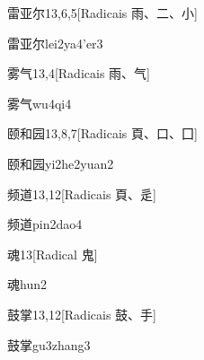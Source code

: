 \begin{entry}{雷亚尔}{13,6,5}[Radicais ⾬、⼆、⼩]
  \begin{phonetics}{雷亚尔}{lei2ya4'er3}
  \end{phonetics}
\end{entry}

\begin{entry}{雾气}{13,4}[Radicais ⾬、⽓]
  \begin{phonetics}{雾气}{wu4qi4}
  \end{phonetics}
\end{entry}

\begin{entry}{颐和园}{13,8,7}[Radicais ⾴、⼝、⼞]
  \begin{phonetics}{颐和园}{yi2he2yuan2}
  \end{phonetics}
\end{entry}

\begin{entry}{频道}{13,12}[Radicais ⾴、⾡]
  \begin{phonetics}{频道}{pin2dao4}
  \end{phonetics}
\end{entry}

\begin{entry}{魂}{13}[Radical ⿁]
  \begin{phonetics}{魂}{hun2}
  \end{phonetics}
\end{entry}

\begin{entry}{鼓掌}{13,12}[Radicais ⿎、⼿]
  \begin{phonetics}{鼓掌}{gu3zhang3}
  \end{phonetics}
\end{entry}


